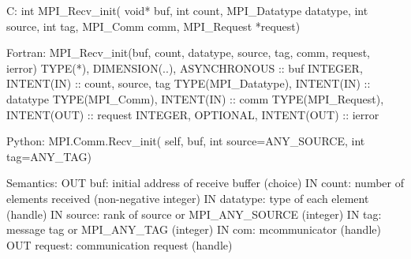 C:
int MPI_Recv_init(
  void* buf, int count, MPI_Datatype datatype,
  int source, int tag, MPI_Comm comm, MPI_Request *request)

Fortran:
MPI_Recv_init(buf, count, datatype, source, tag, comm, request,
ierror)
TYPE(*), DIMENSION(..), ASYNCHRONOUS :: buf
INTEGER, INTENT(IN) :: count, source, tag
TYPE(MPI_Datatype), INTENT(IN) :: datatype
TYPE(MPI_Comm), INTENT(IN) :: comm
TYPE(MPI_Request), INTENT(OUT) :: request
INTEGER, OPTIONAL, INTENT(OUT) :: ierror

Python:
MPI.Comm.Recv_init(
    self, buf, int source=ANY_SOURCE, int tag=ANY_TAG)

Semantics:
OUT buf: initial address of receive buffer (choice)
IN count: number of elements received (non-negative integer)
IN datatype: type of each element (handle)
IN source: rank of source or MPI_ANY_SOURCE (integer)
IN tag: message tag or MPI_ANY_TAG (integer)
IN com: mcommunicator (handle)
OUT request: communication request (handle)
